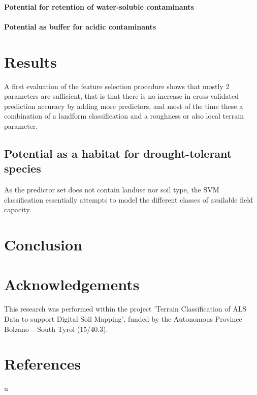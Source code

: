 \documentclass[preprint,12pt,authoryear]{elsarticle}
\begin{document}
\paragraph{Potential for retention of water-soluble contaminants}

\paragraph{Potential as buffer for acidic contaminants}


\section{Results}
A first evaluation of the feature selection procedure shows that mostly 2 parameters are sufficient, that is that there is no increase in cross-validated prediction accuracy  by adding more predictors, and most of the time these a combination of a landform classification and a roughness or also local terrain parameter.
\subsection{Potential as a habitat for drought-tolerant species}
As the predictor set does not contain landuse nor soil type, the SVM classification essentially attempts to model the different classes of available field capacity.
\section{Conclusion}
 

\section*{Acknowledgements} This research was performed within the project 'Terrain Classification of ALS Data to support Digital Soil Mapping', funded by the Autonomous Province Bolzano -- South Tyrol (15/40.3).

\section*{References}
u
\end{document}
